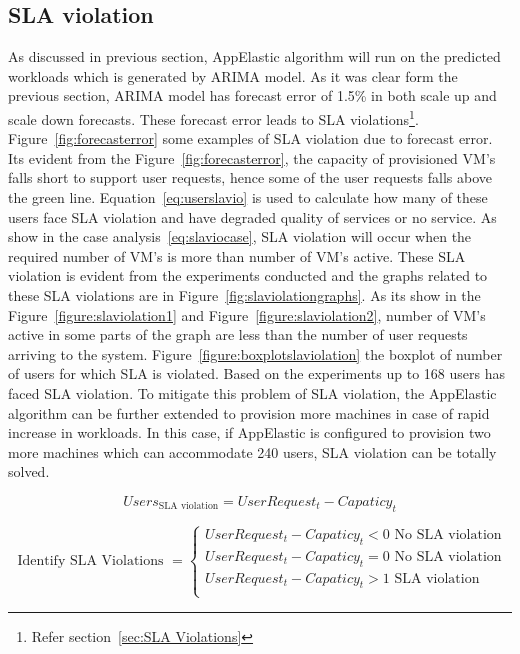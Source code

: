 \subsection{SLA violation}
\label{sub:SLA violation}
As discussed in previous section, AppElastic algorithm will run on the predicted workloads which is generated by ARIMA model. As it was clear form the previous section, ARIMA model has forecast error of 1.5\% in both scale up and scale down forecasts. These forecast error leads to SLA violations\footnote{Refer section~\ref{sec:SLA Violations}}. Figure~\ref{fig:forecasterror} some examples of SLA violation due to forecast error. Its evident from the Figure~\ref{fig:forecasterror}, the capacity of provisioned VM's falls short to support user requests, hence some of the user requests falls above the green line. Equation~\ref{eq:userslavio} is used to calculate how many of these users face SLA violation and have degraded quality of services or no service. As show in the case analysis~\ref{eq:slaviocase}, SLA violation will occur when the required number of VM's is more than number of VM's active. These SLA violation is evident from the experiments conducted and the graphs related to these SLA violations are in Figure~\ref{fig:slaviolationgraphs}. As its show in the Figure~\ref{figure:slaviolation1} and Figure~\ref{figure:slaviolation2}, number of VM's active in some parts of the graph are less than the number of user requests arriving to the system. Figure~\ref{figure:boxplotslaviolation} the boxplot of number of users for which SLA is violated. Based on the experiments up to 168 users has faced SLA violation. To mitigate this problem of SLA violation, the AppElastic algorithm can be further extended to provision more machines in case of rapid increase in workloads. In this case, if AppElastic is configured to provision two more machines which can accommodate 240 users, SLA violation can be totally solved.

\begin{equation}
Users_{\textrm{SLA violation}} = UserRequest_{t} - Capaticy_{t}
\label{eq:userslavio}
\end{equation}

\begin{equation}
\textrm{ Identify SLA Violations }=
  \begin{cases}
    UserRequest_{t} - Capaticy_{t} < 0 \textrm{ No SLA violation}\\
    UserRequest_{t} - Capaticy_{t} = 0 \textrm{ No SLA violation}\\
    UserRequest_{t} - Capaticy_{t} > 1 \textrm{ SLA violation}\\
\end{cases}
\label{eq:slaviocase}
\end{equation}

